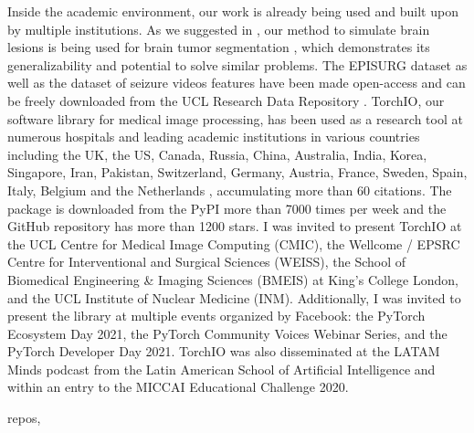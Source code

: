 Inside the academic environment, our work is already being used and built upon by multiple institutions.
As we suggested in \cite{perez-garcia_self-supervised_2021}, our method to simulate brain lesions is being used for brain tumor segmentation \cite{zhang_self-supervised_2021}, which demonstrates its generalizability and potential to solve similar problems.
The EPISURG dataset as well as the dataset of seizure videos features have been made open-access and can be freely downloaded from the UCL Research Data Repository \cite{perez-garcia_episurg_2020,perez-garcia_data_2021}.
TorchIO, our software library for medical image processing, has been used as a research tool at numerous hospitals and leading academic institutions in various countries including the UK, the US, Canada, Russia, China, Australia, India, Korea, Singapore, Iran, Pakistan, Switzerland, Germany, Austria, France, Sweden, Spain, Italy, Belgium and the Netherlands%
, accumulating more than 60 citations.
The package is downloaded from the \ac{PyPI} more than 7000 times per week and the GitHub repository has more than 1200 stars.
I was invited to present TorchIO at the UCL Centre for Medical Image Computing (CMIC), the Wellcome / EPSRC Centre for Interventional and Surgical Sciences (WEISS), the School of Biomedical Engineering \& Imaging Sciences (BMEIS) at King's College London, and the UCL Institute of Nuclear Medicine (INM).
Additionally, I was invited to present the library at multiple events organized by Facebook: the PyTorch Ecosystem Day 2021, the PyTorch Community Voices Webinar Series, and the PyTorch Developer Day 2021.
TorchIO was also disseminated at the LATAM Minds podcast from the Latin American School of Artificial Intelligence and within an entry to the MICCAI Educational Challenge 2020.

repos,



